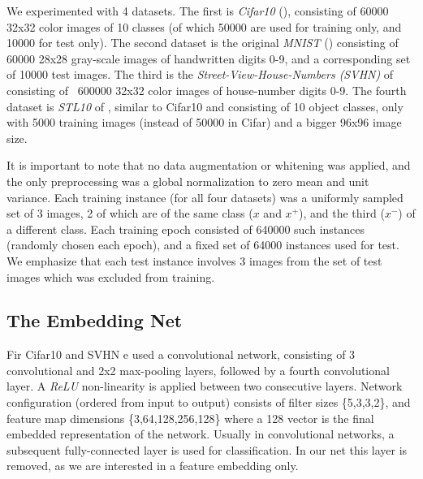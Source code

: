 \documentclass{article} %
\begin{document}
We experimented with  4 datasets.  The first is \emph{Cifar10}  (\citet{krizhevsky2009learning}), consisting of 60000 32x32 color images of 10 classes (of which 50000 are used for training only, and 10000 for test only). 
The second dataset is the original \emph{MNIST} (\citet{lecun1998gradient}) consisting of 60000 28x28 gray-scale images of handwritten digits 0-9, and a corresponding set of 10000 test images.
The third is the  \emph{Street-View-House-Numbers (SVHN)} of \citet{netzer2011reading} consisting of ~600000 32x32 color images of house-number digits 0-9.
The fourth dataset   is \emph{STL10} of \citet{coates2011analysis}, similar to Cifar10 and consisting of 10 object classes, only with 5000 training images (instead of 50000 in Cifar) and a bigger 96x96 image size.


It is important to note that no data augmentation or whitening was applied, and the only preprocessing was a global normalization to zero mean and unit variance.
Each training instance (for all four datasets) was a uniformly sampled set of 3 images, 2 of which are of the same class ($x$ and $x^{+}$), and the third ($x^{-}$)  of a different class. Each training epoch consisted of 640000 such instances (randomly chosen each epoch), and a fixed set of 64000 instances used for test. We emphasize that each test instance involves 3 images from the set of test images which was excluded from training.
\subsection{The Embedding Net}
Fir Cifar10 and SVHN e used a convolutional network, consisting of 3 convolutional and 2x2 max-pooling layers, followed by a fourth convolutional layer. A \emph{ReLU} non-linearity is applied between two consecutive layers.
Network configuration (ordered from input to output) consists of filter sizes \{5,3,3,2\}, and feature map dimensions \{3,64,128,256,128\} where a 128 vector is the final embedded representation of the network. Usually in convolutional networks, a subsequent fully-connected
layer is used for classification. In our net this layer is removed, as we are interested in a feature embedding only.
\end{document}
